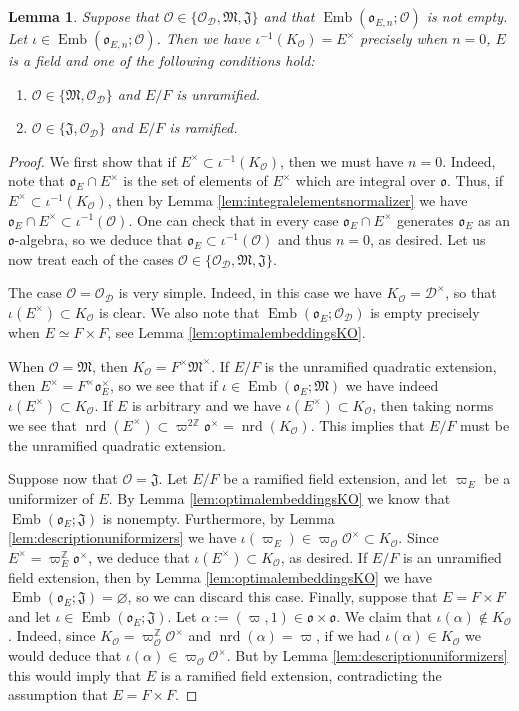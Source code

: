 \documentclass{article}
\newtheorem{lem}{Lemma}[section]
\theoremstyle{named}
\newcommand{\D}{\mathcal{D}}
\newcommand{\Z}{\mathbb{Z}}
\newcommand{\M}{\mathfrak{M}}
\newcommand{\J}{\mathfrak{J}}
\renewcommand{\O}{\mathcal{O}}
\renewcommand{\o}{\mathfrak{o}}
\DeclareMathOperator{\Emb}{Emb}
\DeclareMathOperator{\nrd}{nrd}
\begin{document}
\begin{lem}\label{lem:adaptedembeddingsorders}
Suppose that $\O \in \{\O_\D, \M, \J\}$ and that $\Emb(\o_{E, n}; \O)$ is not empty. Let $\iota \in \Emb(\o_{E, n}; \O)$. Then we have $\iota^{-1}(K_\O) = E^\times$ precisely when $n = 0$, $E$ is a field and one of the following conditions hold:
\begin{enumerate}
    \item [i)] $\O \in \{\M, \O_\D\}$ and $E/F$ is unramified.
    \item [ii)] $\O \in \{\J, \O_\D\}$ and $E/F$ is ramified.
\end{enumerate}
\end{lem}

\begin{proof}
We first show that if $E^\times \subset \iota^{-1}(K_\O)$, then we must have $n = 0$. Indeed, note that $\o_E \cap E^\times$ is the set of elements of $E^\times$ which are integral over $\o$. Thus, if $E^\times \subset \iota^{-1}(K_\O)$, then by Lemma \ref{lem:integralelementsnormalizer} we have $\o_E \cap E^\times \subset \iota^{-1}(\O)$. One can check that in every case $\o_E \cap E^\times$ generates $\o_E$ as an $\o$-algebra, so we deduce that $\o_E \subset \iota^{-1}(\O)$ and thus $n=0$, as desired. Let us now treat each of the cases $\O \in \{\O_\D, \M, \J\}$.

The case $\O = \O_\D$ is very simple. Indeed, in this case we have $K_\O =  \D^\times$, so that $\iota(E^\times) \subset K_\O$ is clear. We also note that $\Emb(\o_E; \O_\D)$ is empty precisely when $E \simeq F \times F$, see Lemma \ref{lem:optimalembeddingsKO}. 

When $\O = \M$, then $K_\O = F^\times \M^\times$. If $E/F$ is the unramified quadratic extension, then $E^\times = F^\times \o_{E}^\times$, so we see that if $\iota \in \Emb(\o_E; \M)$ we have indeed $\iota(E^\times) \subset K_\O$. If $E$ is arbitrary and we have $\iota(E^\times)\subset K_\O$, then taking norms we see that $\nrd(E^\times)\subset \varpi^{2\Z}\o^\times = \nrd(K_\O)$. This implies that $E/F$ must be the unramified quadratic extension. 

Suppose now that $\O = \J$. Let $E/F$ be a ramified field extension, and let $\varpi_E$ be a uniformizer of $E$. By Lemma \ref{lem:optimalembeddingsKO} we know that $\Emb(\o_E; \J)$ is nonempty. Furthermore, by Lemma \ref{lem:descriptionuniformizers} we have $\iota(\varpi_E) \in \varpi_\O \O^\times \subset K_\O$. Since $E^\times = \varpi_E^{\Z}\o^\times$, we deduce that $\iota(E^\times)\subset K_\O$, as desired. If $E/F$ is an unramified field extension, then by Lemma \ref{lem:optimalembeddingsKO} we have $\Emb(\o_E; \J) = \varnothing$, so we can discard this case. Finally, suppose that $E = F \times F$ and let $\iota \in \Emb(\o_E; \J)$. Let $\alpha := (\varpi, 1) \in \o \times \o$. We claim that $\iota(\alpha) \notin K_\O$. Indeed, since $K_\O = \varpi_\O^{\Z}\O^\times$ and $\nrd(\alpha) = \varpi$, if we had $\iota(\alpha) \in K_\O$ we would deduce that $\iota(\alpha) \in \varpi_\O \O^\times$. But by Lemma \ref{lem:descriptionuniformizers} this would imply that $E$ is a ramified field extension, contradicting the assumption that $E  = F\times F$. 
\end{proof}
\end{document}
